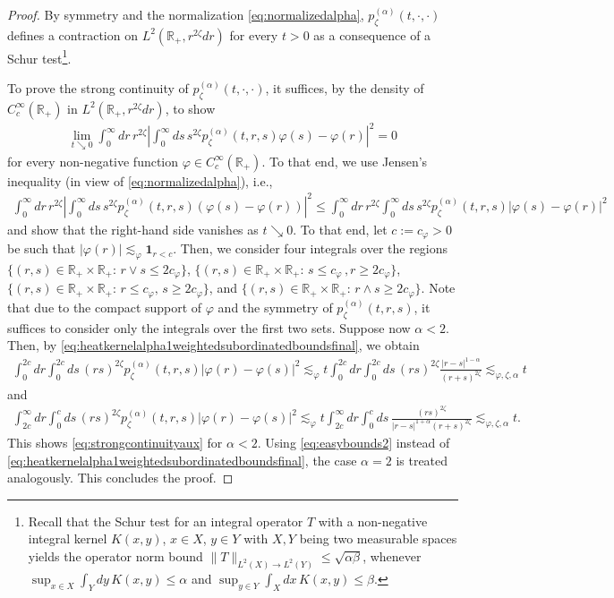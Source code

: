 \documentclass[12pt,reqno,a4paper]{amsart}
\theoremstyle{definition}
\theoremstyle{remark}
\numberwithin{equation}{section}
\newcommand{\1}{\mathbbm{1}}
\renewcommand{\phi}{\varphi}
\newcommand{\R}{\mathbb{R}}
\newcommand{\one}{\mathbf{1}}
\begin{document}
\begin{proof}
  By symmetry and the normalization \eqref{eq:normalizedalpha}, $p_\zeta^{(\alpha)}(t,\cdot,\cdot)$ defines a contraction on $L^2(\R_+,r^{2\zeta}dr)$ for every $t>0$ as a consequence of a Schur test\footnote{Recall that the Schur test for an integral operator $T$ with a non-negative integral kernel $K(x,y)$, $x\in X$, $y\in Y$ with $X,Y$ being two measurable spaces yields the operator norm bound $\|T\|_{L^2(X)\to L^2(Y)}\leq\sqrt{\alpha\beta}$, whenever $\sup_{x\in X}\int_Y dy\, K(x,y)\leq\alpha$ and $\sup_{y\in Y}\int_X dx\, K(x,y)\leq\beta$.}.
  
  To prove the strong continuity of $p_{\zeta}^{(\alpha)}(t,\cdot,\cdot)$, it suffices, by the density of $C_c^\infty(\R_+)$ in $L^2(\R_+,r^{2\zeta}dr)$, to show
  \begin{align}
    \label{eq:strongcontinuityaux}
    \lim_{t\searrow0} \int_0^\infty dr\, r^{2\zeta} \left|\int_0^\infty ds\, s^{2\zeta} p_\zeta^{(\alpha)}(t,r,s)\phi(s) - \phi(r)\right|^2 = 0
  \end{align}
  for every non-negative function $\phi\in C_c^\infty(\R_+)$.
  To that end, we use Jensen's inequality (in view of \eqref{eq:normalizedalpha}), i.e.,
  \begin{align*}
    \int_0^\infty dr\, r^{2\zeta}\left|\int_0^\infty ds\, s^{2\zeta} p_\zeta^{(\alpha)}(t,r,s)(\phi(s)-\phi(r))\right|^2
    \leq \int_0^\infty dr\, r^{2\zeta} \int_0^\infty ds\, s^{2\zeta}p_\zeta^{(\alpha)}(t,r,s)|\phi(s)-\phi(r)|^2
  \end{align*}
  and show that the right-hand side vanishes as $t\searrow0$.
  To that end, let $c:=c_\phi>0$ be such that $|\phi(r)|\lesssim_\phi\one_{r<c}$. Then, we consider four integrals over the regions
  $\{(r,s)\in\R_+\times\R_+:\, r\vee s\leq 2c_\phi\}$,
  $\{(r,s)\in\R_+\times\R_+:\, s\leq c_\phi\,, r\geq 2c_\phi\}$,
  $\{(r,s)\in\R_+\times\R_+:\, r\leq c_\phi,\, s\geq 2c_\phi\}$, and
  $\{(r,s)\in\R_+\times\R_+:\, r\wedge s\geq 2c_\phi\}$.
  Note that due to the compact support of $\phi$ and the symmetry of $p_\zeta^{(\alpha)}(t,r,s)$, it suffices to consider only the integrals over the first two sets. Suppose now $\alpha<2$. Then, by \eqref{eq:heatkernelalpha1weightedsubordinatedboundsfinal}, we obtain
  \begin{align*}
    \int_0^{2c} dr \int_0^{2c} ds\, (rs)^{2\zeta}p_\zeta^{(\alpha)}(t,r,s)|\phi(r)-\phi(s)|^2
    \lesssim_\phi t\int_0^{2c} dr \int_0^{2c} ds\, (rs)^{2\zeta} \frac{|r-s|^{1-\alpha}}{(r+s)^{2\zeta}}
    \lesssim_{\phi,\zeta,\alpha} t
  \end{align*}
  and
  \begin{align*}
    \int_{2c}^\infty dr \int_0^c ds\, (rs)^{2\zeta}p_\zeta^{(\alpha)}(t,r,s)|\phi(r)-\phi(s)|^2
    \lesssim_\phi t\int_{2c}^\infty dr \int_0^c ds\, \frac{(rs)^{2\zeta}}{|r-s|^{1+\alpha}(r+s)^{2\zeta}}
    \lesssim_{\phi,\zeta,\alpha}t.
  \end{align*}
  This shows \eqref{eq:strongcontinuityaux} for $\alpha<2$.
  Using \eqref{eq:easybounds2} instead of \eqref{eq:heatkernelalpha1weightedsubordinatedboundsfinal}, the case $\alpha=2$ is treated analogously.
  This concludes the proof.
\end{proof}
\end{document}
